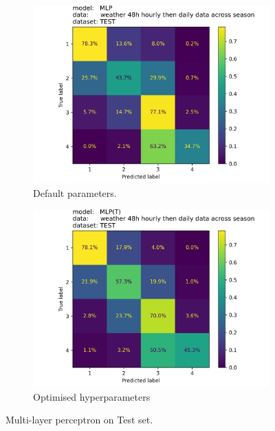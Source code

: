 \documentclass{article}
\begin{document}
	\begin{figure}[h]
		\centering
		\begin{subfigure}[b]{0.49\textwidth}
			\includegraphics[width=\textwidth]{sais_confusion_matrix_MLP____weather_48h_hourly_then_daily_data_across_season_test.png}
			\caption{Default parameters.}
		\end{subfigure}
		\hfill
		\begin{subfigure}[b]{0.49\textwidth}
			\includegraphics[width=\textwidth]{sais_confusion_matrix_MLP(T)_weather_48h_hourly_then_daily_data_across_season_test.png}
			\caption{Optimised hyperparameters}
		\end{subfigure}
		\label{fig:mlp}
		\caption{Multi-layer perceptron on Test set.}
	\end{figure}
\end{document}
